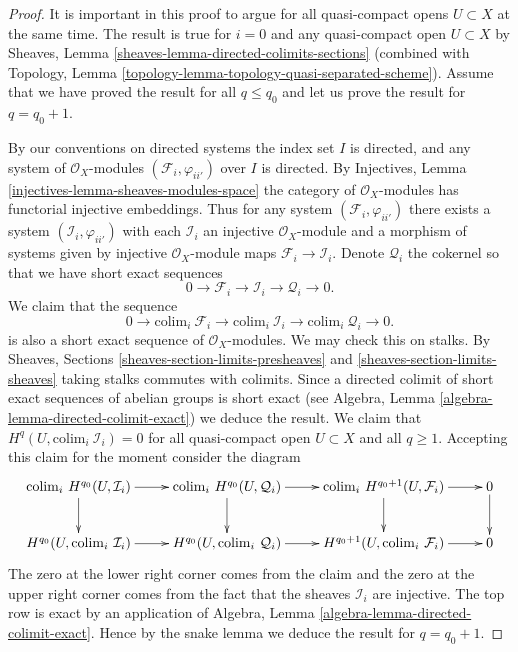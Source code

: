 \begin{proof}
It is important in this proof to argue for all quasi-compact opens
$U \subset X$ at the same time.
The result is true for $i = 0$ and any quasi-compact open $U \subset X$ by
Sheaves, Lemma \ref{sheaves-lemma-directed-colimits-sections}
(combined with
Topology, Lemma \ref{topology-lemma-topology-quasi-separated-scheme}).
Assume that we have proved the result for all $q \leq q_0$ and let
us prove the result for $q = q_0 + 1$.

\medskip\noindent
By our conventions on directed systems the index set $I$ is directed,
and any system of $\mathcal{O}_X$-modules $(\mathcal{F}_i, \varphi_{ii'})$
over $I$ is directed.
By Injectives, Lemma \ref{injectives-lemma-sheaves-modules-space} the category
of $\mathcal{O}_X$-modules has functorial injective embeddings.
Thus for any system $(\mathcal{F}_i, \varphi_{ii'})$ there exists a
system $(\mathcal{I}_i, \varphi_{ii'})$ with each $\mathcal{I}_i$ an
injective $\mathcal{O}_X$-module and a morphism of systems given
by injective $\mathcal{O}_X$-module maps
$\mathcal{F}_i \to \mathcal{I}_i$. Denote $\mathcal{Q}_i$ the
cokernel so that we have short exact sequences
$$
0 \to
\mathcal{F}_i \to
\mathcal{I}_i \to
\mathcal{Q}_i \to 0.
$$
We claim that the sequence
$$
0 \to
\text{colim}_i\ \mathcal{F}_i \to
\text{colim}_i\ \mathcal{I}_i \to
\text{colim}_i\ \mathcal{Q}_i \to 0.
$$
is also a short exact sequence of $\mathcal{O}_X$-modules.
We may check this on stalks. By
Sheaves, Sections \ref{sheaves-section-limits-presheaves}
and \ref{sheaves-section-limits-sheaves}
taking stalks commutes with colimits. Since a directed colimit
of short exact sequences of abelian groups is short exact
(see Algebra, Lemma \ref{algebra-lemma-directed-colimit-exact})
we deduce the result. We claim that
$H^q(U, \text{colim}_i\ \mathcal{I}_i) = 0$ for all quasi-compact
open $U \subset X$ and all $q \geq 1$. Accepting this claim
for the moment consider the diagram
$$
\xymatrix{
\text{colim}_i\ H^{q_0}(U, \mathcal{I}_i) \ar[d] \ar[r] &
\text{colim}_i\ H^{q_0}(U, \mathcal{Q}_i) \ar[d] \ar[r] &
\text{colim}_i\ H^{q_0 + 1}(U, \mathcal{F}_i) \ar[d] \ar[r] &
0 \ar[d] \\
H^{q_0}(U, \text{colim}_i\ \mathcal{I}_i) \ar[r] &
H^{q_0}(U, \text{colim}_i\ \mathcal{Q}_i) \ar[r] &
H^{q_0 + 1}(U, \text{colim}_i\ \mathcal{F}_i) \ar[r] &
0
}
$$
The zero at the lower right corner comes from the claim and the 
zero at the upper right corner comes from the fact that the sheaves
$\mathcal{I}_i$ are injective.
The top row is exact by an application of
Algebra, Lemma \ref{algebra-lemma-directed-colimit-exact}.
Hence by the snake lemma we deduce the
result for $q = q_0 + 1$.


\end{proof}
